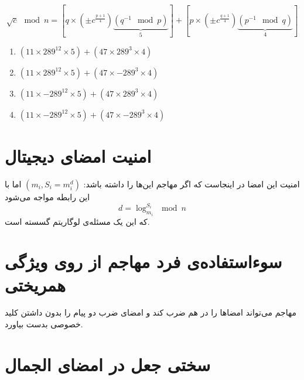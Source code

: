 \documentclass{article}
\begin{document}
\begin{latin}
\begin{equation*}
\sqrt{c} \mod n = \left[q\times(\pm c^{\frac{p+1}{4}})\underbrace{(q^{-1} \mod p)}_{5}\right] + \left[p\times(\pm c^{\frac{q+1}{4}})\underbrace{(p^{-1} \mod q)}_{4}\right]
\end{equation*}

\begin{enumerate}
\item $(11\times289^{12}\times5) + (47\times289^{3}\times4)$
\item $(11\times289^{12}\times5) + (47\times-289^{3}\times4)$
\item $(11\times-289^{12}\times5) + (47\times289^{3}\times4)$
\item $(11\times-289^{12}\times5) + (47\times-289^{3}\times4)$
\end{enumerate}
\end{latin}

\section{امنیت امضای دیجیتال }
امنیت این امضا در اینجاست که اگر مهاجم این‌ها را داشته باشد:
$(m_i, S_i = m^{d}_{i})$
اما با این رابطه مواجه می‌شود
\[
d = \log^{S_i}_{m_i} \mod n
\]
که این یک مسئله‌ی لوگاریتم گسسته است.

\section{سوء‌استفاده‌ی فرد مهاجم از روی ویژگی همریختی }
مهاجم می‌تواند امضاها را در هم ضرب کند و امضای ضرب دو پیام را بدون داشتن کلید خصوصی بدست بیاورد.

\section{سختی جعل در امضای الجمال}
\end{document}
